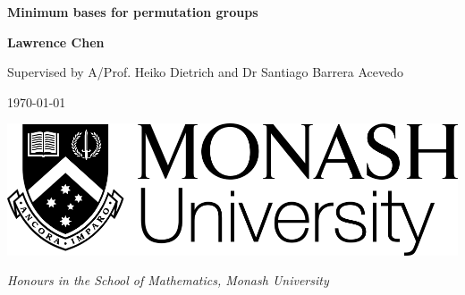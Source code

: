 \begin{titlepage}
    \begin{center}
        \vspace*{4cm}

        \Huge
        \textbf{Minimum bases for permutation groups}

        \vspace{2cm}

        \LARGE
        \textbf{Lawrence Chen}

        \Large
        Supervised by A/Prof. Heiko Dietrich and Dr Santiago Barrera Acevedo

        \vspace{2cm}

        \Large
        \today

        \vspace{4cm}
        \begin{center}
            \includegraphics[scale=0.4]{monash_university_logo.png}
        \end{center}
        \vfill

        \textit{Honours \thesis{} in the School of Mathematics, Monash University}
    \end{center}
\end{titlepage}
